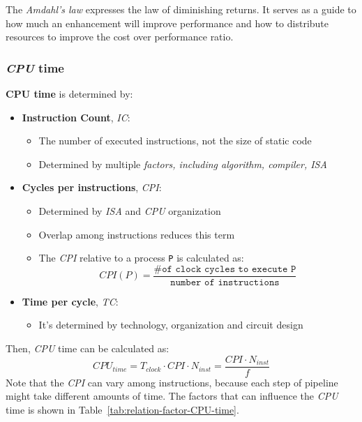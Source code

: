 \documentclass[english]{article}
\begin{document}

The \textit{Amdahl's law} expresses the law of diminishing returns.
It serves as a guide to how much an enhancement will improve performance and how to distribute resources to improve the cost over performance ratio.

\subsubsection{\textit{CPU} time}

\textbf{CPU time} is determined by:

\begin{itemize}
  \item \textbf{Instruction Count}, \textit{IC}:
        \begin{itemize}
          \item The number of executed instructions, not the size of static code
          \item Determined by multiple \textit{factors, including algorithm, compiler, ISA}
        \end{itemize}
  \item \textbf{Cycles per instructions}, \textit{CPI}:
        \begin{itemize}
          \item Determined by \textit{ISA} and \textit{CPU} organization
          \item Overlap among instructions reduces this term
          \item The \textit{CPI} relative to a process \texttt{P} is calculated as:
                \[ CPI(P) = \dfrac{\texttt{\# of clock cycles to execute P}}{\texttt{number of instructions}} \]
        \end{itemize}
  \item \textbf{Time per cycle}, \textit{TC}:
        \begin{itemize}
          \item It's determined by technology, organization and circuit design
        \end{itemize}
\end{itemize}

\bigskip
Then, \textit{CPU} time can be calculated as:
\[ CPU_{time} = T_{clock} \cdot CPI \cdot N_{inst} = \dfrac{CPI \cdot N_{inst}}{f} \]
Note that the \textit{CPI} can vary among instructions, because each step of pipeline might take different amounts of time.
The factors that can influence the \textit{CPU} time is shown in Table~\ref{tab:relation-factor-CPU-time}.
\end{document}
